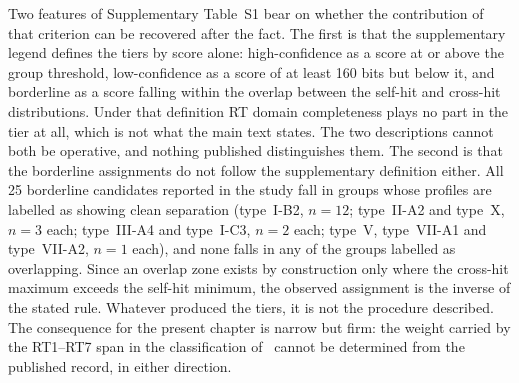 Two features of Supplementary Table~S1 bear on whether the contribution of
that criterion can be recovered after the fact. The first is that the
supplementary legend defines the tiers by score alone: high-confidence as a
score at or above the group threshold, low-confidence as a score of at least
160 bits but below it, and borderline as a score falling within the overlap
between the self-hit and cross-hit distributions. Under that definition RT
domain completeness plays no part in the tier at all, which is not what the
main text states. The two descriptions cannot both be operative, and nothing
published distinguishes them. The second is that the borderline assignments do
not follow the supplementary definition either. All 25 borderline candidates
reported in the study fall in groups whose profiles are labelled as showing
clean separation (type~I-B2, $n = 12$; type~II-A2 and type~X, $n = 3$ each;
type~III-A4 and type~I-C3, $n = 2$ each; type~V, type~VII-A1 and type~VII-A2,
$n = 1$ each), and none falls in any of the groups labelled as overlapping.%
Since an overlap zone exists by construction only where the cross-hit maximum
exceeds the self-hit minimum, the observed assignment is the inverse of the
stated rule. Whatever produced the tiers, it is not the procedure described.
The consequence for the present chapter is narrow but firm: the weight carried
by the RT1--RT7 span in the classification of~\cite{toro2026} cannot be
determined from the published record, in either direction.



